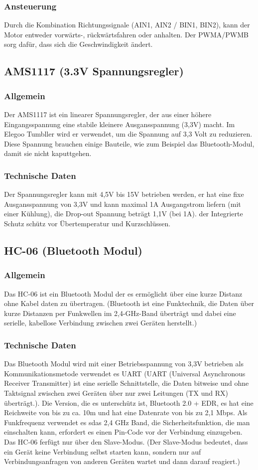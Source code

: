 \subsubsection{Ansteuerung}
Durch die Kombination Richtungssignale (AIN1, AIN2 / BIN1, BIN2), kann der Motor entweder vorwärts-, rückwärtsfahren oder anhalten.
Der PWMA/PWMB sorg dafür, dass sich die Geschwindigkeit ändert.
%
\subsection{AMS1117 (3.3V Spannungsregler)}
%
\subsubsection{Allgemein}
Der AMS1117 ist ein linearer Spannungsregler, der aus einer höhere Eingangsspannung eine stabile kleinere Ausgansspannung (3,3V) macht. 
Im Elegoo Tumbller wird er verwendet, um die Spannung auf 3,3 Volt zu reduzieren. Diese Spannung brauchen einige Bauteile, wie zum Beispiel das Bluetooth-Modul, damit sie nicht kaputtgehen.
\subsubsection{Technische Daten}
Der Spannungsregler kann mit 4,5V bis 15V betrieben werden, er hat eine fixe Ausgansspannung von 3,3V und kann maximal 1A Ausgangstrom liefern (mit einer Kühlung), 
die Drop-out Spannung beträgt 1,1V (bei 1A). der Integrierte Schutz schütz vor Übertemperatur und Kurzschlüssen.
%
\subsection{HC-06 (Bluetooth Modul)}
%
\subsubsection{Allgemein}
Das HC-06 ist ein Bluetooth Modul der es ermöglicht über eine kurze Distanz ohne Kabel daten zu übertragen. 
(Bluetooth ist eine Funktechnik, die Daten über kurze Distanzen per Funkwellen im 2,4-GHz-Band überträgt und dabei eine serielle, kabellose Verbindung zwischen zwei Geräten herstellt.)
\subsubsection{Technische Daten}
Das Bluetooth Modul wird mit einer Betriebsspannung von 3,3V betrieben als Kommunikationsmetode verwendet es UART 
(UART (Universal Asynchronous Receiver Transmitter) ist eine serielle Schnittstelle, die Daten bitweise und ohne Taktsignal zwischen zwei Geräten über nur zwei Leitungen (TX und RX) überträgt.).  
Die Version, die es unterschütz ist, Bluetooth 2.0 + EDR, es hat eine Reichweite von bis zu ca.  10m und hat eine Datenrate von bis zu 2,1 Mbps. 
Als Funkfrequenz verwendet es sdas 2,4 GHz Band, die Sicherheitsfunktion, die man einschalten kann, erfordert es einen Pin-Code vor der Verbindung einzugeben. 
Das HC-06 ferfügt nur über den Slave-Modus. 
(Der Slave-Modus bedeutet, dass ein Gerät keine Verbindung selbst starten kann, sondern nur auf Verbindungsanfragen von anderen Geräten wartet und dann darauf reagiert.)
